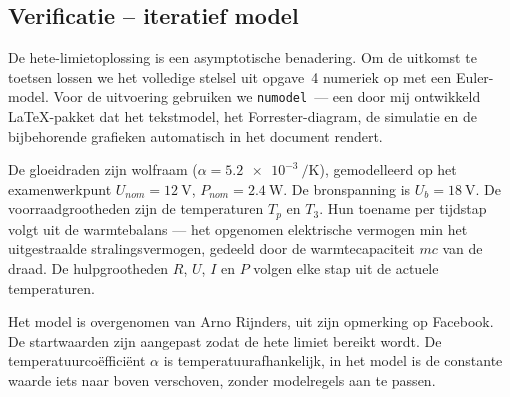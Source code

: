 \documentclass[addpoints,11pt,a4paper]{exam}
\begin{document}
\begin{questions}
\newpage
\section*{Verificatie -- iteratief model}

De hete-limietoplossing is een asymptotische benadering. Om de uitkomst te toetsen lossen we het volledige stelsel uit opgave~4 numeriek op met een Euler-model. Voor de uitvoering gebruiken we \texttt{numodel}~--- een door mij ontwikkeld \LaTeX-pakket dat het tekstmodel, het Forrester-diagram, de simulatie en de bijbehorende grafieken automatisch in het document rendert.

De gloeidraden zijn wolfraam ($\alpha = \qty{5.2e-3}{\per\K}$), gemodelleerd op het examenwerkpunt $U_{nom} = \qty{12}{\V}$, $P_{nom} = \qty{2.4}{\W}$. De bronspanning is $U_b = \qty{18}{\V}$. De voorraadgrootheden zijn de temperaturen $T_p$ en $T_3$. Hun toename per tijdstap volgt uit de warmtebalans --- het opgenomen elektrische vermogen min het uitgestraalde stralingsvermogen, gedeeld door de warmtecapaciteit $mc$ van de draad. De hulpgrootheden $R$, $U$, $I$ en $P$ volgen elke stap uit de actuele temperaturen.

Het model is overgenomen van Arno Rijnders, uit zijn opmerking op Facebook. De startwaarden zijn aangepast zodat de hete limiet bereikt wordt. De temperatuurcoëfficiënt $\alpha$ is temperatuurafhankelijk, in het model is de constante waarde iets naar boven verschoven, zonder modelregels aan te passen.








\end{questions}
\end{document}
